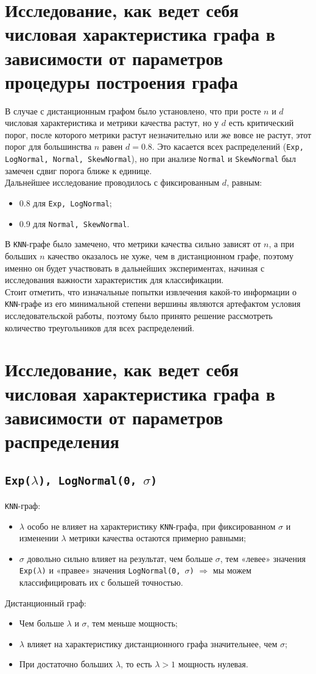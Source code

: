 \documentclass[12pt,a4paper]{report}
\begin{document}
\section{Исследование, как ведет себя числовая характеристика графа в зависимости от параметров процедуры построения графа}
В случае с дистанционным графом было установлено, что при росте $n$ и $d$ числовая характеристика и метрики качества растут, но у $d$ есть критический порог, после которого метрики растут незначительно или же вовсе не растут, этот порог для большинства $n$ равен $d = 0.8$. Это касается всех распределений (\texttt{Exp, LogNormal, Normal, SkewNormal}), но при анализе \texttt{Normal} и \texttt{SkewNormal} был замечен сдвиг порога ближе к единице.\\
Дальнейшее исследование проводилось с фиксированным $d$, равным:
\begin{itemize}
    \item 0.8 для \texttt{Exp, LogNormal};
    \item 0.9 для \texttt{Normal, SkewNormal}.
\end{itemize}
В \texttt{KNN}-графе было замечено, что метрики качества сильно зависят от $n$, а при больших $n$ качество оказалось не хуже, чем в дистанционном графе, поэтому именно он будет участвовать в дальнейших экспериментах, начиная с исследования важности характеристик для классификации.\\
Стоит отметить, что изначальные попытки извлечения какой-то информации о \texttt{KNN}-графе из его минимальной степени вершины являются артефактом условия исследовательской работы, поэтому было принято решение рассмотреть количество треугольников для всех распределений.

\section{Исследование, как ведет себя числовая характеристика графа в зависимости от параметров распределения}
\subsection{\texttt{Exp($\lambda$), LogNormal(0, $\sigma$)}}
\texttt{KNN}-граф:
\begin{itemize}
    \item $\lambda$ особо не влияет на характеристику \texttt{KNN}-графа, при фиксированном $\sigma$ и изменении $\lambda$ метрики качества остаются примерно равными;
    \item $\sigma$ довольно сильно влияет на результат, чем больше $\sigma$, тем «левее» значения \texttt{Exp($\lambda$)} и «правее» значения \texttt{LogNormal(0, $\sigma$)} $\Rightarrow$ мы можем классифицировать их с большей точностью.
\end{itemize}
Дистанционный граф:
\begin{itemize}
    \item Чем больше $\lambda$ и $\sigma$, тем меньше мощность;
    \item $\lambda$ влияет на характеристику дистанционного графа значительнее, чем $\sigma$;
    \item При достаточно больших $\lambda$, то есть $\lambda > 1$ мощность нулевая.
\end{itemize}
\end{document}
